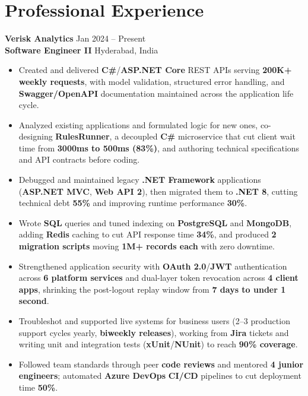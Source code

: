 \documentclass[a4paper,10pt]{article}
\begin{document}
\section*{Professional Experience}

\textbf{Verisk Analytics} \hfill Jan 2024 -- Present \\
\textbf{Software Engineer II} \hfill Hyderabad, India

\begin{itemize}[leftmargin=*]
    \item Created and delivered \textbf{C\#}/\textbf{ASP.NET Core} REST APIs serving \textbf{200K+ weekly requests}, with model validation, structured error handling, and \textbf{Swagger/OpenAPI} documentation maintained across the application life cycle.
    \item Analyzed existing applications and formulated logic for new ones, co-designing \textbf{RulesRunner}, a decoupled \textbf{C\#} microservice that cut client wait time from \textbf{3000ms to 500ms (83\%)}, and authoring technical specifications and API contracts before coding.
    \item Debugged and maintained legacy \textbf{.NET Framework} applications (\textbf{ASP.NET MVC}, \textbf{Web API 2}), then migrated them to \textbf{.NET 8}, cutting technical debt \textbf{55\%} and improving runtime performance \textbf{30\%}.
    \item Wrote \textbf{SQL} queries and tuned indexing on \textbf{PostgreSQL} and \textbf{MongoDB}, adding \textbf{Redis} caching to cut API response time \textbf{34\%}, and produced \textbf{2 migration scripts} moving \textbf{1M+ records each} with zero downtime.
    \item Strengthened application security with \textbf{OAuth 2.0}/\textbf{JWT} authentication across \textbf{6 platform services} and dual-layer token revocation across \textbf{4 client apps}, shrinking the post-logout replay window from \textbf{7 days to under 1 second}.
    \item Troubleshot and supported live systems for business users (2--3 production support cycles yearly, \textbf{biweekly releases}), working from \textbf{Jira} tickets and writing unit and integration tests (\textbf{xUnit}/\textbf{NUnit}) to reach \textbf{90\% coverage}.
    \item Followed team standards through peer \textbf{code reviews} and mentored \textbf{4 junior engineers}; automated \textbf{Azure DevOps} \textbf{CI/CD} pipelines to cut deployment time \textbf{50\%}.
\end{itemize}
\end{document}
